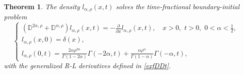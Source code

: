 \documentclass[10pt,a4paper]{amsart}
\newtheorem{theorem}{Theorem}
\begin{document}
\begin{theorem}	
	{The density $l_{\alpha,\rho}(x,t)$  solves the time-fractional boundary-initial problem}
	\begin{equation}\label{temp3}
		\begin{cases}
			(\mathbb{D}^{2\alpha,\rho} + \mathbb{D}^{\alpha,\rho}) l_{\alpha, \rho}(x,t) = -\frac{\partial}{\partial x} l_{\alpha, \rho}(x,t), \quad x > 0,\,\, t > 0,\,\, 0 < \alpha < \frac{1}{2},  \\
			l_{\alpha, \rho}(x,0) = \delta(x), \\
			l_{\alpha, \rho}(0,t) = \frac{2\alpha \rho^{2\alpha}}{\Gamma(1-2\alpha)} \Gamma(-2\alpha, t) + \frac{\alpha \rho^\alpha}{\Gamma(1-\alpha)} \Gamma(-\alpha, t),
		\end{cases}
			\end{equation}
with the generalized R-L derivatives defined in \eqref{exfDDt}.
\end{theorem}	
\end{document}
